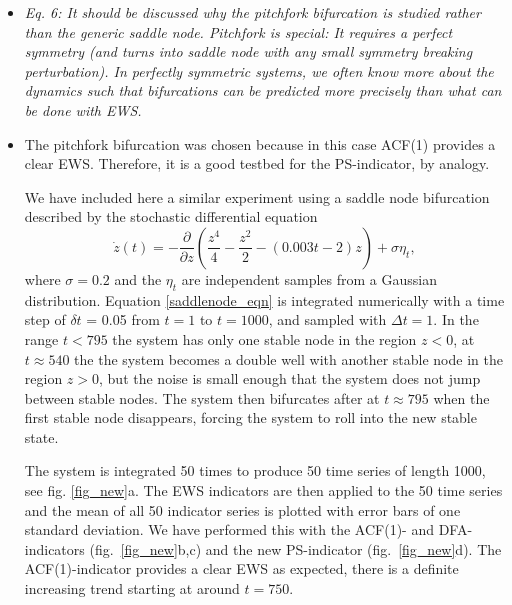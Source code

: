\documentclass[12pt]{article}
\begin{document}
\begin{itemize}
\item[\bf Comment 9.]
{\sl 
Eq. 6: It should be discussed why the pitchfork bifurcation 
is studied rather than the generic saddle node. Pitchfork is special: 
It requires a perfect symmetry (and turns into saddle node with any 
small symmetry breaking perturbation). In perfectly symmetric systems, 
we often know more about the dynamics such that bifurcations can be 
predicted more precisely than what can be done with EWS.
}

\item[\bf Response.] 
The pitchfork bifurcation was chosen because in this case
ACF(1) provides a clear EWS. Therefore, it is a good testbed for the PS-indicator, by analogy.  

We have included here a similar experiment using a saddle node bifurcation described by the stochastic differential equation 
\begin{equation} 
\dot{z}(t) = -\frac{\partial}{\partial z}\left(\frac{z^4}{4} - \frac{z^2}{2} - \left(0.003t - 2\right)z\right) + \sigma\eta_t, 
\label{saddlenode_eqn} 
\end{equation} 
where $\sigma=0.2$ and the $\eta_t$ are independent samples from a Gaussian distribution. Equation \ref{saddlenode_eqn} is integrated numerically with a time step of $\delta t$ = 0.05 from $t=1$ to $t=1000$, and sampled with $\Delta t = 1$. In the range $t<795$ the system has only one stable node in the region $z<0$, at $t\approx 540$ the the system becomes a double well with another stable node in the region $z>0$, but the noise is small enough that the system does not jump between stable nodes. The system then bifurcates after at $t\approx 795$ when the first stable node disappears, forcing the system to roll into the new stable state.

The system is integrated 50 times to produce 50 time series of length 1000, see fig. \ref{fig_new}a. The EWS indicators are then applied to the 50 time series and the mean of all 50 indicator series is plotted with error bars of one standard deviation. We have performed this with the ACF(1)- and DFA-indicators (fig.~\ref{fig_new}b,c) and the new PS-indicator (fig.~\ref{fig_new}d). The ACF(1)-indicator provides a clear EWS as expected, there is a definite increasing trend starting at around $t=750$.


\end{itemize}
\end{document}
